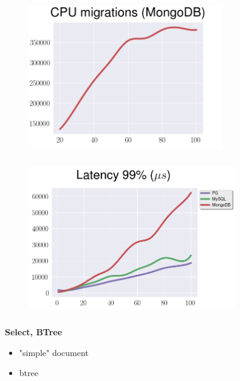 \documentclass[usenames,dvipsnames, 18pt, compress, aspectratio=169]{beamer}
\begin{document}
\begin{frame}
    \frametitle{}
    \begin{center}
    \vspace{10pt}
    \begin{figure}
        \includegraphics[width=0.75\textwidth,center]{benchmarks/mongodb_cpu_migrations.png}
    \end{figure}
    \end{center}
\end{frame}

\begin{frame}
    \frametitle{}
    \begin{center}
    \vspace{10pt}
    \begin{figure}
        \includegraphics[width=0.8\textwidth,center]{benchmarks/select_jsonb_path_ops_latency_99.png}
    \end{figure}
    \end{center}
\end{frame}

\begin{frame}
    \frametitle{}
    \begin{center}
        \textbf{Select, BTree }
        \begin{itemize}[label={}]
            \item "simple" document
            \item btree
        \end{itemize}
    \end{center}
\end{frame}
\end{document}
